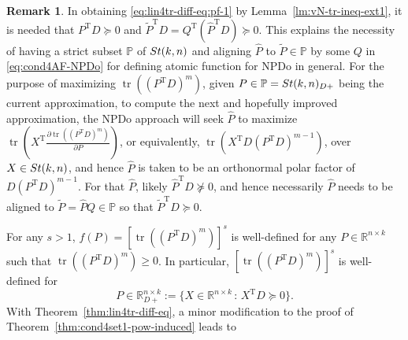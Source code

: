 \documentclass[11pt]{article}
\def\bbP{\mathbb{P}}
\def\bbR{\mathbb{R}}
\def\wtd{\widetilde}
\def\what{\widehat}
\newcommand\STM[2]{{\rm St}(#1,#2)}
\DeclareMathOperator{\tr}{tr}
\DeclareMathOperator{\T}{T}
\theoremstyle{definition}
\newtheorem{remark}{Remark}[section]
\numberwithin{equation}{section}
\begin{document}
\begin{remark}\label{rk:lin4tr-diff-eq}
In obtaining \eqref{eq:lin4tr-diff-eq:pf-1} by Lemma~\ref{lm:vN-tr-ineq-ext1}, it is needed that
$P^{\T}D\succeq 0$ and $\wtd P^{\T}D=Q^{\T}(\what P^{\T}D)\succeq 0$. This explains the necessity of  having a strict subset $\bbP$ of
$\STM{k}{n}$ and aligning $\what P$ to $\wtd P\in\bbP$ by some $Q$ in \eqref{eq:cond4AF-NPDo} for defining atomic function for NPDo in general.
For the purpose of maximizing $\tr((P^{\T}D)^m)$, given $P\in\bbP=\STM{k}{n}_{D+}$ being the current approximation, to compute the next and hopefully improved
approximation, the NPDo approach will seek $\what P$ to maximize
$\tr\left(X^{\T}\frac{\partial \tr((P^{\T}D)^m)}{\partial P}\right)$, or equivalently,
$\tr(X^{\T}D(P^{\T}D)^{m-1})$, over $X\in\STM{k}{n}$, and hence $\what P$ is taken to be an orthonormal polar factor of $D(P^{\T}D)^{m-1}$.
For that $\what P$, likely $\what P^{\T}D\not\succeq 0$, and hence necessarily $\what P$ needs to be aligned to $\wtd P=\what PQ\in\bbP$
so that $\wtd P^{\T}D\succeq 0$.
\end{remark}


For any $s>1$,  $f(P)=[\tr((P^{\T}D)^m)]^s$ is  well-defined for any $P\in\bbR^{n\times k}$
such that $\tr((P^{\T}D)^m)\ge 0$.
In particular, $[\tr((P^{\T}D)^m)]^s$ is well-defined
for
$$
P\in\bbR_{D+}^{n\times k}:=\{X\in\bbR^{n\times k}\,:\,X^{\T}D\succeq 0\}.
$$
With Theorem~\ref{thm:lin4tr-diff-eq}, a minor modification to the proof of Theorem~\ref{thm:cond4set1-pow-induced}
leads to
\end{document}
